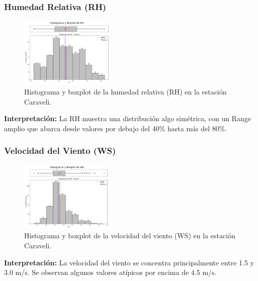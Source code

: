 \subsubsection*{Humedad Relativa (RH)}
\begin{figure}[H]
\centering
\includegraphics[width=0.4\textwidth]{resultados/por_estacion_meteorologica/Caraveli/RH_histograma.png}
\caption{Histograma y boxplot de la humedad relativa (RH) en la estación Caraveli.}
\label{fig:caraveli_RH}
\end{figure}
\textbf{Interpretación:} La RH muestra una distribución algo simétrica, con un Range amplio que abarca desde valores por debajo del 40\% hasta más del 80\%.

\subsubsection*{Velocidad del Viento (WS)}
\begin{figure}[H]
\centering
\includegraphics[width=0.4\textwidth]{resultados/por_estacion_meteorologica/Caraveli/WS_histograma.png}
\caption{Histograma y boxplot de la velocidad del viento (WS) en la estación Caraveli.}
\label{fig:caraveli_WS}
\end{figure}
\textbf{Interpretación:} La velocidad del viento se concentra principalmente entre 1.5 y 3.0 m/s. Se observan algunos valores atípicos por encima de 4.5 m/s.

